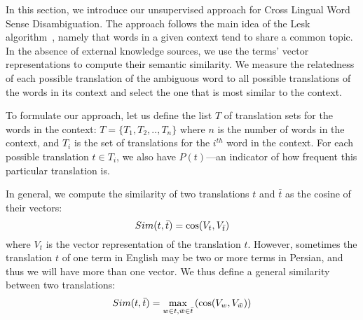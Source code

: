 In this section, we introduce our unsupervised approach for Cross Lingual Word Sense Disambiguation. The approach follows the main idea of the Lesk algorithm~\cite{lesk1986automatic}, namely that words in a given context tend to share a common topic. %
 In the absence of external knowledge sources, we use the terms' vector representations to compute their semantic similarity. %
We measure the relatedness of each possible translation of the ambiguous word to all possible translations of the words in its context and select the one that is most similar to the context. %

To formulate our approach, let us define the list $T$ of translation sets for the words in the context: $T=\{{T_1,T_2,..,T_n} \}$ where $n$ is the number of words in the context, and $T_i$ is the set of translations for the $i^{th}$ word in the context. For each possible translation $t\in T_i$, we also have $P(t)$---an indicator of how frequent this particular translation is.

In general, we compute the similarity of two translations $t$ and $\bar{t}$ as the cosine of their vectors:
\vspace{-0.2cm}
\begin{equation}
  Sim(t,\bar{t}) = \cos(V_t,V_{\bar{t}}) 
  \label{formula:sim2}
\vspace{-0.2cm}
\end{equation}
where $V_t$ is the vector representation of the translation $t$. However, sometimes the translation $t$ of one term in English may be two or more terms in Persian, and thus we will have more than one vector. We thus define a general similarity between two translations:
\vspace{-0.2cm}
\begin{equation}
  Sim(t,\bar{t}) = \max_{w \in t, \bar{w} \in \bar{t}}\left(\cos(V_w,V_{\bar{w}})\right) 
  \label{formula:sim}
\vspace{-0.2cm}
\end{equation}

